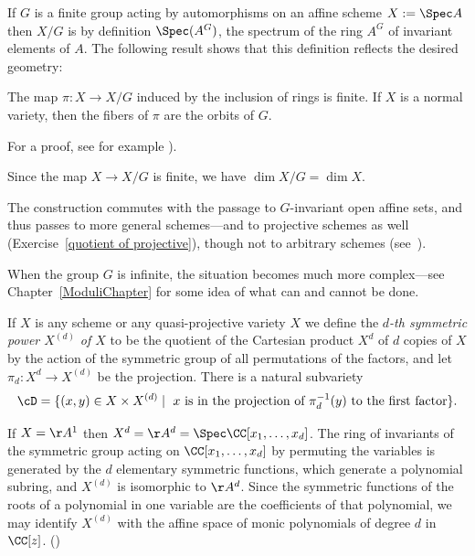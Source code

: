 If $G$ is a finite group acting by automorphisms on an affine scheme $X:=\Spec A$ then $X/G$ is by definition $\Spec(A^G)$, the spectrum of the ring $A^G$ of invariant elements of $A$. The following result shows that this definition reflects the desired geometry: 

\begin{theorem}\label{finite invariant theory}

 The map $\pi: X\to X/G$ induced by the inclusion of rings is finite. If $X$ is a normal variety, then the fibers of $\pi$  are the orbits of $G$.
 
\end{theorem}
For a proof, see for example \cite[Proposition 13.10]{Eisenbud1995}).  

Since the map $X\to X/G$ is finite, we have $\dim X/G = \dim X$. 

The construction commutes with the passage to $G$-invariant open affine sets, and thus passes to more general schemes---and to projective schemes as well (Exercise~\ref{quotient of projective}), though not to arbitrary schemes (see~\cite[Example 5.3.2]{Olsson-Stacks}).

When the group $G$ is infinite, the situation becomes much more complex---see Chapter~\ref{ModuliChapter} for some  idea of what can and cannot be done.

If $X$ is any scheme or any quasi-projective variety $X$ we define the \emph{$d$-th symmetric power $X^{(d)}$ of $X$} to be the quotient of the Cartesian product $X^d$ of $d$ copies of $X$ by the action of the symmetric group of all permutations of the factors, and let $\pi_d: X^d\to X^{(d)}$ be the projection. There is a natural
subvariety 
$$
\cD = \{(x,y) \in X \times X^{(d)}\mid \hbox{ $x$ is in the projection of $\pi_d^{-1}(y)$ to the first factor}\}.
$$



If $X=\AA^{1}$ then $X^{d} = \AA^{d} = \Spec \CC[x_{1}, \dots, x_{d}]$. The ring of invariants of the symmetric group acting on
$\CC[x_{1}, \dots, x_{d}]$ by permuting the variables is generated by the $d$ elementary symmetric functions, which generate a polynomial subring, and $X^{(d)}$ is isomorphic to $\AA^{d}$. Since the symmetric functions of the roots of a polynomial in one variable are the coefficients of
that polynomial, we may identify $X^{(d)}$ with the affine space of monic polynomials of degree $d$ in $\CC[z]$. (\cite[Exercises 1.6, 13.2-13.4]{Eisenbud1995})

